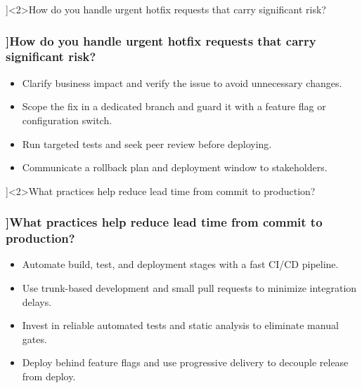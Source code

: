 \QuestionSlide[\CategoryBadge[AuthColor!20]{Cloud}]<2>{How do you handle urgent hotfix requests that carry significant risk?}
\begin{frame}[fragile]
  \frametitle{\AnswerTitle[\CategoryBadge[AuthColor!20]{Cloud}]{How do you handle urgent hotfix requests that carry significant risk?}}

  {\footnotesize
  \begin{itemize}
    \item Clarify business impact and verify the issue to avoid unnecessary changes.
    \item Scope the fix in a dedicated branch and guard it with a feature flag or configuration switch.
    \item Run targeted tests and seek peer review before deploying.
    \item Communicate a rollback plan and deployment window to stakeholders.
  \end{itemize}
  }
\end{frame}

\QuestionSlide[\CategoryBadge[AuthColor!20]{Cloud}]<2>{What practices help reduce lead time from commit to production?}
\begin{frame}[fragile]
  \frametitle{\AnswerTitle[\CategoryBadge[AuthColor!20]{Cloud}]{What practices help reduce lead time from commit to production?}}

  {\footnotesize
  \begin{itemize}
    \item Automate build, test, and deployment stages with a fast CI/CD pipeline.
    \item Use trunk-based development and small pull requests to minimize integration delays.
    \item Invest in reliable automated tests and static analysis to eliminate manual gates.
    \item Deploy behind feature flags and use progressive delivery to decouple release from deploy.
  \end{itemize}
  }
\end{frame}
